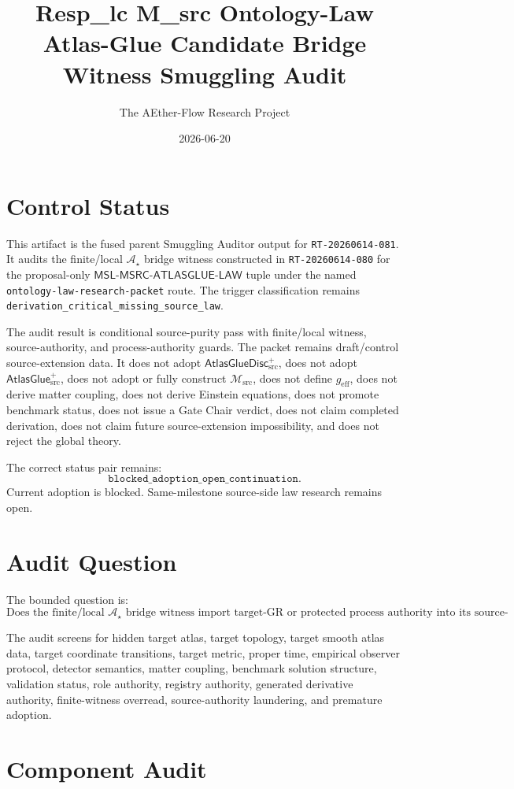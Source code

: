 \documentclass[11pt]{article}
\title{Resp\_lc M\_src Ontology-Law Atlas-Glue Candidate Bridge Witness Smuggling Audit}
\author{The AEther-Flow Research Project}
\date{2026-06-20}
\newcommand{\Msrc}{\mathcal{M}_{\mathrm{src}}}
\newcommand{\geff}{g_{\mathrm{eff}}}
\newcommand{\AtlasGlue}{\mathsf{AtlasGlue}_{\mathrm{src}}^{+}}
\newcommand{\AtlasGlueDisc}{\mathsf{AtlasGlueDisc}_{\mathrm{src}}^{+}}
\newcommand{\MSL}{\mathsf{MSL}\mbox{-}\mathsf{MSRC}\mbox{-}\mathsf{ATLASGLUE}\mbox{-}\mathsf{LAW}}
\newcommand{\Astar}{\mathcal A_{\star}}
\begin{document}
\maketitle

\section*{Control Status}

This artifact is the fused parent Smuggling Auditor output for
\texttt{RT-20260614-081}. It audits the finite/local
\(\Astar\) bridge witness constructed in \texttt{RT-20260614-080} for the
proposal-only \(\MSL\) tuple under the named
\texttt{ontology-law-research-packet} route. The trigger classification
remains \texttt{derivation\_critical\_missing\_source\_law}.

The audit result is conditional source-purity pass with finite/local witness,
source-authority, and process-authority guards. The packet remains
draft/control source-extension data. It does not adopt \(\AtlasGlueDisc\),
does not adopt \(\AtlasGlue\), does not adopt or fully construct \(\Msrc\),
does not define \(\geff\), does not derive matter coupling, does not derive
Einstein equations, does not promote benchmark status, does not issue a Gate
Chair verdict, does not claim completed derivation, does not claim future
source-extension impossibility, and does not reject the global theory.

The correct status pair remains:
\[
  \texttt{blocked\_adoption\_open\_continuation}.
\]
Current adoption is blocked. Same-milestone source-side law research remains
open.

\section{Audit Question}

The bounded question is:
\[
\text{Does the finite/local }\Astar\text{ bridge witness import target-GR or
protected process authority into its source-law premises?}
\]

The audit screens for hidden target atlas, target topology, target smooth
atlas data, target coordinate transitions, target metric, proper time,
empirical observer protocol, detector semantics, matter coupling, benchmark
solution structure, validation status, role authority, registry authority,
generated derivative authority, finite-witness overread, source-authority
laundering, and premature adoption.

\section{Component Audit}
\end{document}
